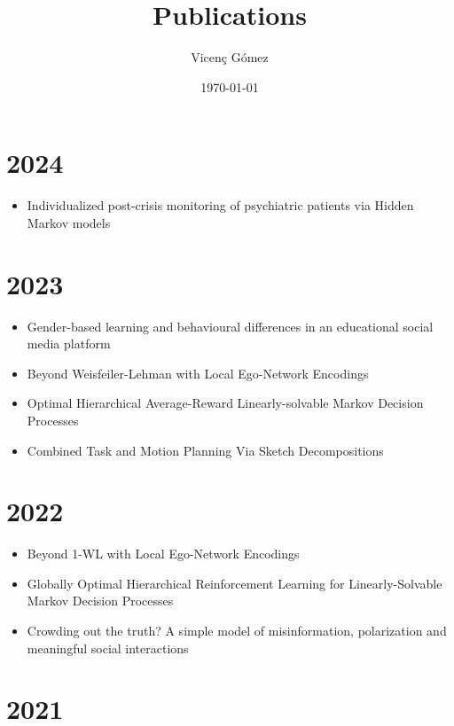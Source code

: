 \documentclass{article}
\title{Publications}
\author{Vicen\c{c} G\'omez}
\date{\today}
\begin{document}
\maketitle

\section*{2024}
\begin{itemize}
\item Individualized post-crisis monitoring of psychiatric patients via Hidden Markov models~\cite{garriga2024}
\end{itemize}


\section*{2023}
\begin{itemize}
\item Gender-based learning and behavioural differences in an educational social media platform~\cite{theophilou2023}
\item Beyond Weisfeiler-Lehman with Local Ego-Network Encodings~\cite{make5040063}
\item Optimal Hierarchical Average-Reward Linearly-solvable Markov Decision Processes~\cite{molina2023optimal}
\item Combined Task and Motion Planning Via Sketch Decompositions~\cite{dalmau-planrob-2023}
\end{itemize}

\section*{2022}

\begin{itemize}
\item Beyond 1-WL with Local Ego-Network Encodings~\cite{alvarez-gonzalez2022beyond}
\item Globally Optimal Hierarchical Reinforcement Learning for Linearly-Solvable Markov Decision Processes~\cite{infante2022globally}
\item Crowding out the truth? A simple model of misinformation, polarization and meaningful social interactions~\cite{fabrizio-ic2s2-2022}
\end{itemize}

\section*{2021}
\end{document}
